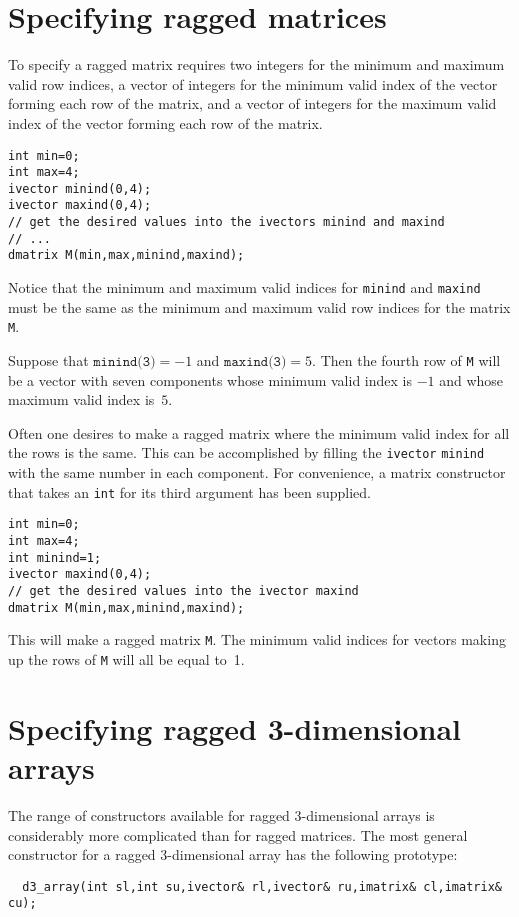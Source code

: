 \documentclass{admbmanual}
\begin{document}
\section{Specifying ragged matrices}

To specify a ragged matrix requires two integers for the minimum and maximum
valid row indices, a vector of integers for the minimum valid index of the
vector forming each row of the matrix, and a vector of integers for the maximum
valid index of the vector forming each row of the matrix.
\begin{lstlisting}
int min=0;
int max=4;
ivector minind(0,4);
ivector maxind(0,4);
// get the desired values into the ivectors minind and maxind
// ...
dmatrix M(min,max,minind,maxind);
\end{lstlisting}

Notice that the minimum and maximum valid indices for \texttt{minind} and
\texttt{maxind} must be the same as the minimum and maximum valid row indices
for the matrix \texttt{M}.

Suppose that $\texttt{minind(3)}=-1$ and $\texttt{maxind(3)}=5$. Then the fourth
row of \texttt{M} will be a vector with seven components whose minimum valid
index is $-1$ and whose maximum valid index is~$5$.

Often one desires to make a ragged matrix where the minimum valid index for all
the rows is the same. This can be accomplished by filling the \texttt{ivector}
\texttt{minind} with the same number in each component. For convenience, a
matrix constructor that takes an \texttt{int} for its third argument has been
supplied.
\begin{lstlisting}
int min=0;
int max=4;
int minind=1;
ivector maxind(0,4);
// get the desired values into the ivector maxind
dmatrix M(min,max,minind,maxind);
\end{lstlisting}
This will make a ragged matrix \texttt{M}. The minimum valid indices for vectors
making up the rows of \texttt{M} will all be equal to~1.

\section{Specifying ragged 3-dimensional arrays}

The range of constructors available for ragged 3-dimensional arrays is
considerably more complicated than for ragged matrices. The most general
constructor for a ragged 3-dimensional array has the following prototype:
\begin{lstlisting}
  d3_array(int sl,int su,ivector& rl,ivector& ru,imatrix& cl,imatrix& cu);
\end{lstlisting}
\end{document}
